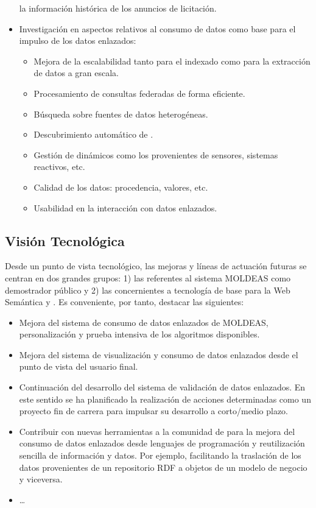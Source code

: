 \begin{itemize}
la información histórica de los anuncios de licitación.
 \item Investigación en aspectos relativos al consumo de datos como base para el impulso de los datos enlazados:
\begin{itemize}
 \item Mejora de la escalabilidad tanto para el indexado como para la extracción de datos a gran escala.
 \item Procesamiento de consultas federadas de forma eficiente.
 \item Búsqueda sobre fuentes de datos heterogéneas.
 \item Descubrimiento automático de \datasets.
 \item Gestión de \datasets dinámicos como los provenientes de sensores, sistemas reactivos, etc.
 \item Calidad de los datos: procedencia, valores, etc.
 \item Usabilidad en la interacción con datos enlazados.
\end{itemize}

\end{itemize}

\subsection{Visión Tecnológica}
Desde un punto de vista tecnológico, las mejoras y líneas de actuación futuras se centran en dos grandes grupos: 1) las referentes 
al sistema \gls{MOLDEAS} como demostrador público y 2) las concernientes a tecnología de base para la Web Semántica y \linkeddata. Es conveniente, 
por tanto, destacar las siguientes:
\begin{itemize}
 \item Mejora del sistema de consumo de datos enlazados de MOLDEAS, personalización y prueba intensiva de los algoritmos disponibles.
 \item Mejora del sistema de visualización y consumo de datos enlazados desde el punto de vista del usuario final.
 \item Continuación del desarrollo del sistema de validación de datos enlazados. En este sentido se ha planificado la realización de 
acciones determinadas como un proyecto fin de carrera para impulsar su desarrollo a corto/medio plazo.
 \item Contribuir con nuevas herramientas a la comunidad de \linkeddata para la mejora del consumo de datos enlazados desde 
lenguajes de programación y reutilización sencilla de información y datos. Por ejemplo, facilitando la traslación de los datos 
provenientes de un repositorio \gls{RDF} a objetos de un modelo de negocio y viceversa.
 \item \ldots
\end{itemize}

